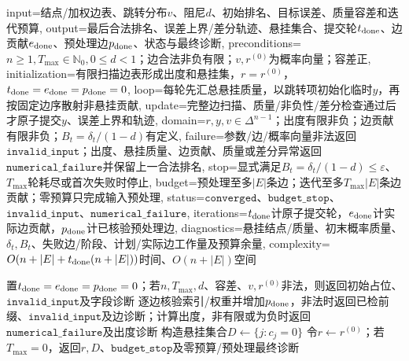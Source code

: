 \begin{AlgorithmContract}{
  input={结点/加权边表、跳转分布$v$、阻尼$d$、初始排名、目标误差、质量容差和迭代预算},
  output={最后合法排名、误差上界/差分轨迹、悬挂集合、提交轮$t_{\rm done}$、边贡献$e_{\rm done}$、预处理边$p_{\rm done}$、状态与最终诊断},
  preconditions={$n\ge1,T_{\max}\in\mathbb N_0,0\le d<1$；边合法非负有限；$v,r^{(0)}$为概率向量；容差正},
  initialization={有限扫描边表形成出度和悬挂集，$r=r^{(0)}$，$t_{\rm done}=e_{\rm done}=p_{\rm done}=0$},
  loop={每轮先汇总悬挂质量，以跳转项初始化临时$y$，再按固定边序散射非悬挂贡献},
  update={完整边扫描、质量/非负性/差分检查通过后才原子提交$y$、误差上界和轨迹},
  domain={$r,y,v\in\Delta^{n-1}$；出度有限非负；边贡献有限非负；$B_t=\delta_t/(1-d)$有定义},
  failure={参数/边/概率向量非法返回$\mathtt{invalid\_input}$；出度、悬挂质量、边贡献、质量或差分异常返回$\mathtt{numerical\_failure}$并保留上一合法排名},
  stop={显式满足$B_t=\delta_t/(1-d)\le\varepsilon$、$T_{\max}$轮耗尽或首次失败时停止},
  budget={预处理至多$|E|$条边；迭代至多$T_{\max}|E|$条边贡献；零预算只完成输入预处理},
  status={$\mathtt{converged}$、$\mathtt{budget\_stop}$、$\mathtt{invalid\_input}$、$\mathtt{numerical\_failure}$},
  iterations={$t_{\rm done}$计原子提交轮，$e_{\rm done}$计实际边贡献，$p_{\rm done}$计已核验预处理边},
  diagnostics={悬挂结点/质量、初末概率质量、$\delta_t,B_t$、失败边/阶段、计划/实际边工作量及预算余量},
  complexity={$O(n+|E|+t_{\rm done}(n+|E|))$时间、$O(n+|E|)$空间}
}
\begin{algorithm}[tbp]
\caption{带悬挂修复的一般\PageRank{}稀疏幂法}\label{alg:V5-C07-general-power}
置$t_{\rm done}=e_{\rm done}=p_{\rm done}=0$；若$n,T_{\max},d$、容差、$v,r^{(0)}$非法，则返回初始占位、$\mathtt{invalid\_input}$及字段诊断\;
逐边核验索引/权重并增加$p_{\rm done}$，非法时返回已检前缀、$\mathtt{invalid\_input}$及边诊断；计算出度，非有限或为负时返回$\mathtt{numerical\_failure}$及出度诊断\;
构造悬挂集合$D\leftarrow\{j:c_j=0\}$\;
令$r\leftarrow r^{(0)}$；若$T_{\max}=0$，返回$r,D$、$\mathtt{budget\_stop}$及零预算/预处理最终诊断\;
\end{algorithm}
\end{AlgorithmContract}
